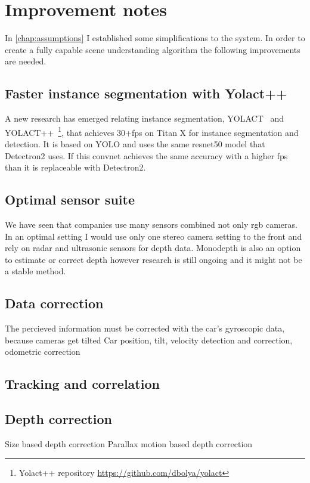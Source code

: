 \chapter{Improvement notes}
\label{chap:improvement}
In \autoref{chap:assumptions} I established some simplifications to the system.
In order to create a fully capable scene understanding algorithm the following
improvements are needed.
\section{Faster instance segmentation with Yolact++}
A new research has emerged relating instance segmentation,
YOLACT~\cite{yolact-iccv2019} and YOLACT++~\cite{yolact-plus-arxiv2019}\footnote{
Yolact++ repository \url{https://github.com/dbolya/yolact}}, that achieves
30+fps on Titan X for instance segmentation and detection. It is based on YOLO
and uses the same resnet50 model that Detectron2 uses. If this convnet achieves
the same accuracy with a higher fps than it is replaceable with Detectron2.

\section{Optimal sensor suite}
We have seen that companies use many sensors combined not only rgb cameras. In
an optimal setting I would use only one stereo camera setting to the front and
rely on radar and ultrasonic sensors for depth data. Monodepth is also an option
to estimate or correct depth however research is still ongoing and it might not
be a stable method.
\section{Data correction}
The percieved information must be corrected with the car's gyroscopic data,
because cameras get tilted Car position, tilt, velocity detection and correction,
odometric correction
\section{Tracking and correlation}
\section{Depth correction}
Size based depth correction
Parallax motion based depth correction

